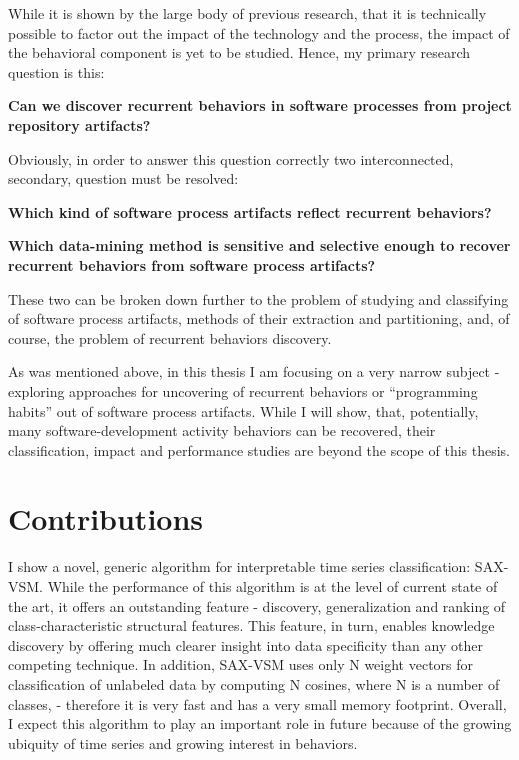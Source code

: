 
While it is shown by the large body of previous research, that it is technically possible 
to factor out the impact of the technology and the process, the impact of the behavioral 
component is yet to be studied. Hence, my primary research question is this:
\begin{myindentpar}{0.07\linewidth}
 \textbf{Can we discover recurrent behaviors in software processes from project
  repository artifacts?}
\end{myindentpar}

Obviously, in order to answer this question correctly two interconnected, secondary, question must be resolved:
\begin{myindentpar}{0.07\linewidth}
 \textbf{Which kind of software process artifacts reflect recurrent behaviors?}
\end{myindentpar}
\begin{myindentpar}{0.07\linewidth}
 \textbf{Which data-mining method is sensitive and selective enough to recover recurrent behaviors
from software process artifacts?}
\end{myindentpar}
These two can be broken down further to the problem of studying and classifying of software process artifacts,
methods of their extraction and partitioning, and, of course, the problem of recurrent behaviors discovery.

As was mentioned above, in this thesis I am focusing on a very narrow subject - exploring approaches
for uncovering of recurrent behaviors or ``programming habits'' out of software process artifacts.
While I will show, that, potentially, many software-development activity behaviors can be recovered,
their classification, impact and performance studies are beyond the scope of this thesis.



\section{Contributions}
I show a novel, generic algorithm for interpretable time series classification: SAX-VSM. 
While the performance of this algorithm is at the level of current state of the art, it offers an outstanding feature -
discovery, generalization and ranking of class-characteristic structural features. This feature, in turn, enables
knowledge discovery by offering much clearer insight into data specificity than any other competing technique.
In addition, SAX-VSM uses only N weight vectors for classification of unlabeled data by computing N cosines, where N is
a number of classes, - therefore it is very fast and has a very small memory footprint.
Overall, I expect this algorithm to play an important role in future because of the growing ubiquity of time series and
growing interest in behaviors.

